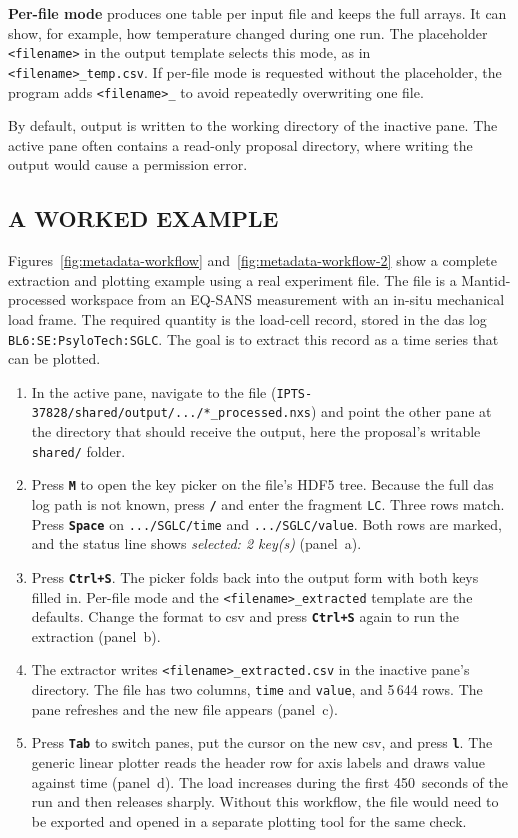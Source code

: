 \documentclass[tm]{ornltm}
\newcommand{\key}[1]{\textbf{\texttt{#1}}}
\begin{document}
\textbf{Per-file mode} produces one table per input file and keeps the full
arrays. It can show, for example, how temperature changed during one run. The
placeholder \texttt{<filename>} in the output template selects this mode, as in
\texttt{<filename>\_temp.csv}. If per-file mode is requested without the
placeholder, the program adds \texttt{<filename>\_} to avoid repeatedly
overwriting one file.

By default, output is written to the working directory of the inactive pane.
The active pane often contains a read-only proposal directory, where writing the
output would cause a permission error.

\subsection{A WORKED EXAMPLE}
\label{sec:metadata-example}

Figures~\ref{fig:metadata-workflow} and~\ref{fig:metadata-workflow-2} show a
complete extraction and plotting example using a real experiment file. The file
is a Mantid-processed workspace from an EQ-SANS measurement with an in-situ
mechanical load frame. The required quantity is the load-cell record, stored in
the \ac{das} log \texttt{BL6:SE:PsyloTech:SGLC}. The goal is to extract this
record as a time series that can be plotted.

\begin{enumerate}
  \item In the active pane, navigate to the file
    (\texttt{IPTS-37828/shared/output/.../*\_processed.nxs}) and point the
    other pane at the directory that should receive the output, here the
    proposal's writable \texttt{shared/} folder.
  \item Press \key{M} to open the key picker on the file's HDF5 tree. Because
    the full \ac{das} log path is not known, press \key{/} and enter the
    fragment \texttt{LC}. Three rows match. Press \key{Space} on
    \texttt{.../SGLC/time} and \texttt{.../SGLC/value}. Both rows are marked,
    and the status line shows \emph{selected: 2 key(s)} (panel~a).
  \item Press \key{Ctrl+S}. The picker folds back into the output form with
    both keys filled in. Per-file mode and the
    \texttt{<filename>\_extracted} template are the defaults. Change the format
    to \ac{csv} and press \key{Ctrl+S} again to run the extraction (panel~b).
  \item The extractor writes
    \texttt{<filename>\_extracted.csv} in the inactive pane's directory. The
    file has two columns, \texttt{time} and \texttt{value}, and 5\,644 rows.
    The pane refreshes and the new file appears (panel~c).
  \item Press \key{Tab} to switch panes, put the cursor on the new \ac{csv},
    and press \key{l}. The generic linear plotter reads the header row for
    axis labels and draws value against time (panel~d). The load increases
    during the first 450~seconds of the run and then releases sharply. Without
    this workflow, the file would need to be exported and opened in a separate
    plotting tool for the same check.
\end{enumerate}
\end{document}
